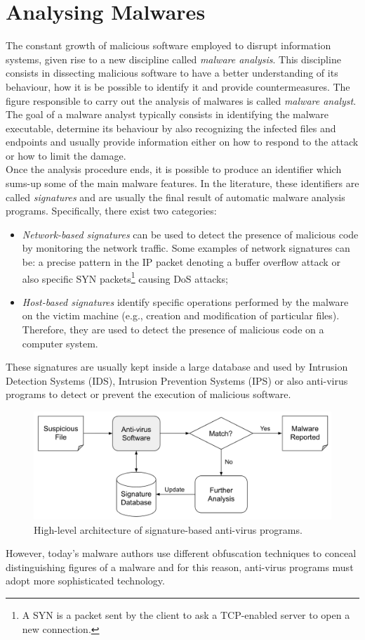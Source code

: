 \documentclass[LaM,binding=0.6cm]{sapthesis}
\begin{document}
\section{Analysing Malwares}
The constant growth of malicious software employed to disrupt information systems, given rise to a new discipline called \textit{malware analysis}. This discipline consists in dissecting malicious software to have a better understanding of its behaviour, how it is be possible to identify it and provide countermeasures\cite{sikorski2012practical}. The figure responsible to carry out the analysis of malwares is called \textit{malware analyst}. The goal of a malware analyst typically consists in identifying the malware executable, determine its behaviour by also recognizing the infected files and endpoints and usually provide information either on how to respond to the attack or how to limit the damage.\\
Once the analysis procedure ends, it is possible to produce an identifier which sums-up some of the main malware features. In the literature, these identifiers are called \textit{signatures} and are usually the final result of automatic malware analysis programs. Specifically, there exist two categories:
\begin{itemize}
\item \textit{Network-based signatures} can be used to detect the presence of malicious code by monitoring the network traffic. Some examples of network signatures can be: a precise pattern in the IP packet denoting a buffer overflow attack or also specific SYN packets\footnote{A SYN is a packet sent by the client to ask a TCP-enabled server to open a new connection.} causing DoS attacks\cite{fuchsberger2005intrusion};
\item \textit{Host-based signatures} identify specific operations performed by the malware on the victim machine (e.g., creation and modification of particular files). Therefore, they are used to detect the presence of malicious code on a computer system.
\end{itemize}
These signatures are usually kept inside a large database and used by Intrusion Detection Systems (IDS), Intrusion Prevention Systems (IPS) or also anti-virus programs to detect or prevent the execution of malicious software. 
\begin{figure}[h!]
\centering
\includegraphics[scale=.5]{images/background2}
\caption{High-level architecture of signature-based anti-virus programs.}
\end{figure}
\newpage
However, today's malware authors use different obfuscation techniques to conceal distinguishing figures of a malware and for this reason, anti-virus programs must adopt more 
sophisticated technology.\\
\end{document}
